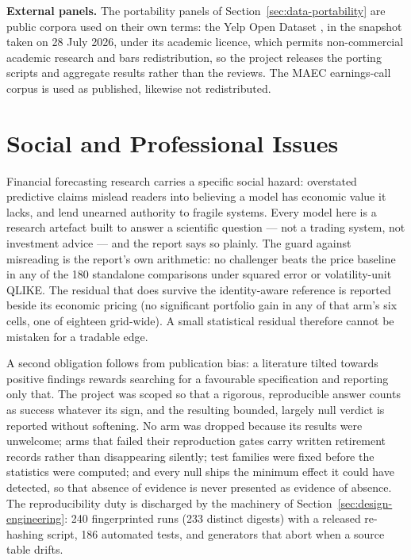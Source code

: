 \textbf{External panels.} The portability panels of Section~\ref{sec:data-portability} are public corpora used on their own terms: the Yelp Open Dataset \cite{yelp2024dataset}, in the snapshot taken on 28 July 2026, under its academic licence, which permits non-commercial academic research and bars redistribution, so the project releases the porting scripts and aggregate results rather than the reviews. The MAEC earnings-call corpus \cite{maec2020} is used as published, likewise not redistributed.

\section{Social and Professional Issues}

Financial forecasting research carries a specific social hazard: overstated predictive claims mislead readers into believing a model has economic value it lacks, and lend unearned authority to fragile systems. Every model here is a research artefact built to answer a scientific question --- not a trading system, not investment advice --- and the report says so plainly. The guard against misreading is the report's own arithmetic: no challenger beats the price baseline in any of the 180 standalone comparisons under squared error or volatility-unit QLIKE. %
The residual that does survive the identity-aware reference is reported beside its economic pricing (no significant portfolio gain in any of that arm's six cells, one of eighteen grid-wide). %
A small statistical residual therefore cannot be mistaken for a tradable edge.

A second obligation follows from publication bias: a literature tilted towards positive findings rewards searching for a favourable specification and reporting only that. The project was scoped so that a rigorous, reproducible answer counts as success whatever its sign, and the resulting bounded, largely null verdict is reported without softening. No arm was dropped because its results were unwelcome; arms that failed their reproduction gates carry written retirement records rather than disappearing silently; test families were fixed before the statistics were computed; and every null ships the minimum effect it could have detected, so that absence of evidence is never presented as evidence of absence. The reproducibility duty is discharged by the machinery of Section~\ref{sec:design-engineering}: 240 fingerprinted runs (233 distinct digests) with a released re-hashing script, 186 automated tests, and generators that abort when a source table drifts. %

